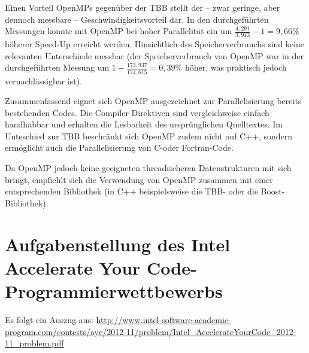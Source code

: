 \documentclass[11pt]{scrartcl}
\begin{document}
Einen Vorteil OpenMPs gegenüber der TBB stellt der -- zwar geringe, aber dennoch messbare -- Geschwindigkeitsvorteil dar. In den durchgeführten Messungen konnte mit OpenMP bei hoher Parallelität ein um $\frac{4,291}{3,913}-1 = 9,66\%$ höherer Speed-Up erreicht werden. Hinsichtlich des Speicherverbrauchs sind keine relevanten Unterschiede messbar (der Speicherverbrauch von OpenMP war in der durchgeführten Messung um $1-\frac{173,937}{174,615} = 0,39\%$ höher, was praktisch jedoch vernachlässigbar ist).

Zusammenfassend eignet sich OpenMP ausgezeichnet zur Parallelisierung bereits besteh\-enden Codes. Die Compiler-Direktiven sind vergleichweise einfach handhabbar und erhalten die Lesbarkeit des ursprünglichen Quelltextes. Im Unteschied zur TBB beschränkt sich OpenMP zudem nicht auf C++, sondern ermöglicht auch die Parallelisierung von C-oder Fortran-Code.

Da OpenMP jedoch keine geeigneten threadsicheren Datenstrukturen mit sich bringt, empfiehlt sich die Verwendung von OpenMP zusammen mit einer entsprechenden Bibliothek (in C++ beispielsweise die TBB- oder die Boost-Bibliothek).


\pagebreak %

\fancyhead[R]{}

\thispagestyle{empty}

\renewcommand*{\biburlprefix}{(URL: }
\renewcommand*{\biburlsuffix}{)}

\pagebreak
{} %


\appendix

\section{Aufgabenstellung des Intel Accelerate Your Code-Programmierwettbewerbs}

\label{intel_ayc_problem}

Es folgt ein Auszug aus:
\url{http://www.intel-software-academic-program.com/contests/ayc/2012-11/problem/Intel_AccelerateYourCode_2012-11_problem.pdf}
\end{document}
